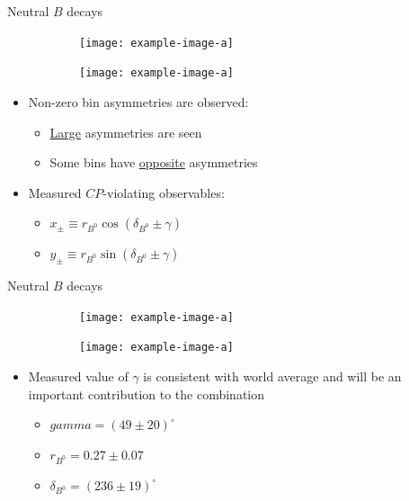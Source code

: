 \documentclass{beamer}
\begin{document}
\begin{frame}{Neutral $B$ decays}
  \begin{figure}
    \begin{subfigure}{0.45\textwidth}
      \texttt{[image: example-image-a]}
    \end{subfigure}%
    \begin{subfigure}{0.45\textwidth}
      \texttt{[image: example-image-a]}
    \end{subfigure}
  \end{figure}
  \begin{itemize}
    \setlength\itemsep{0.5em}
    \item{Non-zero bin asymmetries are observed:}
    \begin{itemize}
      \item{\underline{Large} asymmetries are seen}
      \item{Some bins have \underline{opposite} asymmetries}
    \end{itemize}
    \item{Measured $C\!P$-violating observables:}
    \begin{itemize}
      \item{$x_\pm\equiv r_{B^0}\cos(\delta_{B^0} \pm \gamma)$}
      \item{$y_\pm\equiv r_{B^0}\sin(\delta_{B^0} \pm \gamma)$}
    \end{itemize}
  \end{itemize}
\end{frame}

\begin{frame}{Neutral $B$ decays}
  \begin{figure}
    \begin{subfigure}{0.45\textwidth}
      \texttt{[image: example-image-a]}
    \end{subfigure}%
    \begin{subfigure}{0.45\textwidth}
      \texttt{[image: example-image-a]}
    \end{subfigure}
  \end{figure}
  \begin{itemize}
    \setlength\itemsep{0.5em}
    \item{Measured value of $\gamma$ is consistent with world average and will be an important contribution to the combination}
    \begin{itemize}
      \item{$gamma = (49 \pm 20)^\circ$}
      \item{$r_{B^0} = 0.27 \pm 0.07$}
      \item{$\delta_{B^0} = (236 \pm 19)^\circ$}
    \end{itemize}
  \end{itemize}
\end{frame}
\end{document}
